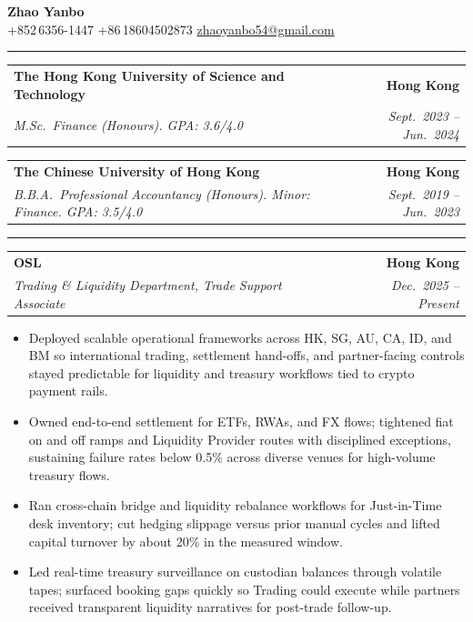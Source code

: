 \documentclass[9pt,a4paper]{extarticle}
\makeatletter
\newcommand{\ressection}[1]{%
  \vspace{0.8em}%
  \noindent{\large\scshape\bfseries #1}\par\nobreak
  \vspace{-\parskip}%
  \vspace{-\parskip}%
  \vspace{-\parskip}%
  \vspace{-\parskip}%
  \noindent\rule{\linewidth}{0.1pt}\par\nobreak
  \vspace{-\parskip}%
}
\newcommand{\resumeSubheading}[4]{%
  \vspace{0.6em}%
  \begin{tabular*}{\textwidth}{l@{\extracolsep{\fill}}r}
    \textbf{#1} & \textbf{#2} \\
    \textit{\small #3} & \textit{\small #4} \\
  \end{tabular*}\vspace{0.32em}}
\makeatother
\begin{document}
\begin{center}
  {\LARGE\bfseries Zhao Yanbo}\\[0.35em]
  \small
  +852\,6356-1447 \;\textbar\;
  +86\,18604502873 \;\textbar\;
  \href{mailto:zhaoyanbo54@gmail.com}{zhaoyanbo54@gmail.com}
\end{center}
\vspace{-0.2em}

\ressection{Education}

\resumeSubheading{The Hong Kong University of Science and Technology}{Hong Kong}{M.Sc.\ Finance (Honours). GPA: 3.6/4.0}{Sept.\ 2023 -- Jun.\ 2024}

\resumeSubheading{The Chinese University of Hong Kong}{Hong Kong}{B.B.A.\ Professional Accountancy (Honours). Minor: Finance. GPA: 3.5/4.0}{Sept.\ 2019 -- Jun.\ 2023}

\ressection{Work Experience}

\resumeSubheading{OSL}{Hong Kong}{Trading \& Liquidity Department, Trade Support Associate}{Dec.\ 2025 -- Present}
\begin{itemize}
  \item Deployed scalable operational frameworks across HK, SG, AU, CA, ID, and BM so international trading, settlement hand-offs, and partner-facing controls stayed predictable for liquidity and treasury workflows tied to crypto payment rails.
  \item Owned end-to-end settlement for ETFs, RWAs, and FX flows; tightened fiat on and off ramps and Liquidity Provider routes with disciplined exceptions, sustaining failure rates below 0.5\% across diverse venues for high-volume treasury flows.
  \item Ran cross-chain bridge and liquidity rebalance workflows for Just-in-Time desk inventory; cut hedging slippage versus prior manual cycles and lifted capital turnover by about 20\% in the measured window.
  \item Led real-time treasury surveillance on custodian balances through volatile tapes; surfaced booking gaps quickly so Trading could execute while partners received transparent liquidity narratives for post-trade follow-up.
\end{itemize}
\end{document}
